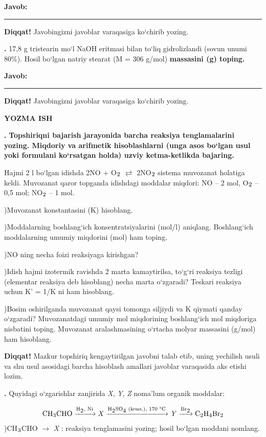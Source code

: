 \documentclass[11pt,a4paper]{article}
\renewcommand{\textsubscript}[1]{\ensuremath{_{\text{\fontsize{8}{8}\selectfont #1}}}}
\newcommand{\qn}[1]{\textbf{\fontsize{11.5}{13}\selectfont #1}}
\newcommand{\qsep}{\par\vspace{1pt}\noindent\rule{0pt}{0.4pt}\par\vspace{5pt}}
\newcommand{\diqqat}[1]{\par\smallskip\noindent\textbf{Diqqat!} #1\par\medskip}
\newcommand{\javob}{\par\smallskip\noindent\textbf{Javob:} \rule[-2pt]{7.5cm}{0.4pt}\par\smallskip\noindent\textbf{Diqqat!} Javobingizni javoblar varaqasiga ko`chirib yozing.\par\medskip}
\begin{document}
\javob\qsep
\noindent\qn{40.} 17,8 g tristearin mo`l NaOH eritmasi bilan to`liq gidrolizlandi (sovun unumi 80\%). Hosil bo`lgan natriy stearat (M = 306 g/mol) \textbf{massasini (g) toping.}
\javob\qsep
\par\bigskip\begin{center}\textbf{\fontsize{13}{15}\selectfont YOZMA ISH}\end{center}
\noindent\qn{41.} \textbf{Topshiriqni bajarish jarayonida barcha reaksiya tenglamalarini yozing. Miqdoriy va arifmetik hisoblashlarni (unga asos bo`lgan usul yoki formulani ko`rsatgan holda) uzviy ketma-ketlikda bajaring.}\par\smallskip
Hajmi 2 l bo`lgan idishda 2NO + O\textsubscript{2} $\rightleftarrows$ 2NO\textsubscript{2} sistema muvozanat holatiga keldi. Muvozanat qaror topganda idishdagi moddalar miqdori: NO -- 2 mol, O\textsubscript{2} -- 0,5 mol; NO\textsubscript{2} -- 1 mol.\par
{})Muvozanat konstantasini (K) hisoblang.\par
{})Moddalarning boshlang`ich konsentratsiyalarini (mol/l) aniqlang. Boshlang`ich moddalarning umumiy miqdorini (mol) ham toping.\par
{})NO ning necha foizi reaksiyaga kirishgan?\par
{})Idish hajmi izotermik ravishda 2 marta kamaytirilsa, to`g`ri reaksiya tezligi (elementar reaksiya deb hisoblang) necha marta o`zgaradi? Teskari reaksiya uchun K' = 1/K ni ham hisoblang.\par
{})Bosim oshirilganda muvozanat qaysi tomonga siljiydi va K qiymati qanday o`zgaradi? Muvozanatdagi umumiy mol miqdorining boshlang`ich mol miqdoriga nisbatini toping. Muvozanat aralashmasining o`rtacha molyar massasini (g/mol) ham hisoblang.\par
\diqqat{Mazkur topshiriq kengaytirilgan javobni talab etib, uning yechilish usuli va shu usul asosidagi barcha hisoblash amallari javoblar varaqasida aks etishi lozim.}\qsep
\noindent\qn{42.} Quyidagi o`zgarishlar zanjirida \textit{X}, \textit{Y}, \textit{Z} noma'lum organik moddalar:\par
\[\setlength{\fboxsep}{0pt}\text{CH\textsubscript{3}CHO}\xrightarrow{\text{H\textsubscript{2}, Ni}}\text{\textit{X}}\xrightarrow{\text{H\textsubscript{2}SO\textsubscript{4} (kons.), 170 \textdegree{}C}}\text{\textit{Y}}\xrightarrow{\text{Br\textsubscript{2}}}\text{C\textsubscript{2}H\textsubscript{4}Br\textsubscript{2}}\]
)CH\textsubscript{3}CHO $\to$ \textit{X} : reaksiya tenglamasini yozing; hosil bo`lgan moddani nomlang.\par
\end{document}
